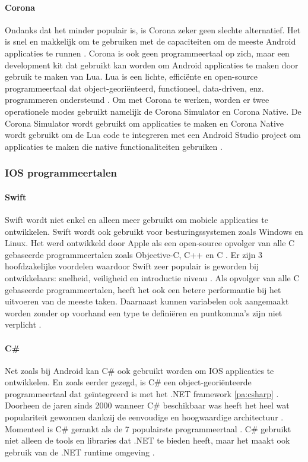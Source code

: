 \paragraph{Corona}
Ondanks dat het minder populair is, is Corona zeker geen slechte alternatief. Het is snel 
en makkelijk om te gebruiken met de capaciteiten om de meeste Android applicaties te runnen 
\autocite{Kesavan2021}. Corona is ook geen programmeertaal op zich, maar een development kit 
dat gebruikt kan worden om Android applicaties te maken door gebruik te maken van Lua. Lua is 
een lichte, efficiënte en open-source programmeertaal dat object-georiënteerd, functioneel, 
data-driven, enz. programmeren ondersteund \autocite{Lua2021}. Om met Corona te werken, worden 
er twee operationele modes gebruikt namelijk de Corona Simulator en Corona Native. De Corona 
Simulator wordt gebruikt om applicaties te maken en Corona Native wordt gebruikt om de Lua 
code te integreren met een Android Studio project om applicaties te maken die native 
functionaliteiten gebruiken \autocite{harkiran2022}.

\subsubsection{IOS programmeertalen}
\paragraph{Swift}
Swift wordt niet enkel en alleen meer gebruikt om mobiele applicaties te ontwikkelen. 
Swift wordt ook gebruikt voor besturingssystemen zoals Windows en Linux. Het werd 
ontwikkeld door Apple als een open-source opvolger van alle C gebaseerde programmeertalen 
zoals Objective-C, C++ en C \autocite{Coursera2022}. Er zijn 3 hoofdzakelijke voordelen 
waardoor Swift zeer populair is geworden bij ontwikkelaars: snelheid, veiligheid en 
introductie niveau \autocite{yuvraj2022}. Als opvolger van alle C gebaseerde programmeertalen, 
heeft het ook een betere performantie bij het uitvoeren van de meeste taken. Daarnaast kunnen 
variabelen ook aangemaakt worden zonder op voorhand een type te definiëren en puntkomma's 
zijn niet verplicht \autocite{Thorndyke2021}.

\paragraph{C\#}
Net zoals bij Android kan C\# ook gebruikt worden om IOS applicaties te ontwikkelen. 
En zoals eerder gezegd, is C\# een object-georiënteerde programmeertaal dat geïntegreerd 
is met het .NET framework \ref{pa:csharp} \autocite{yuvraj2022}. Doorheen de jaren sinds 
2000 wanneer C\# beschikbaar was heeft het heel wat populariteit gewonnen dankzij de 
eenvoudige en hoogwaardige architectuur \autocite{yuvraj2022}. Momenteel is C\# gerankt 
als de 7 populairste programmeertaal \autocite{Johns2023}. C\# gebruikt niet alleen de 
tools en libraries dat .NET te bieden heeft, maar het maakt ook gebruik van de .NET runtime 
omgeving \autocite{Pruciak2022}.


